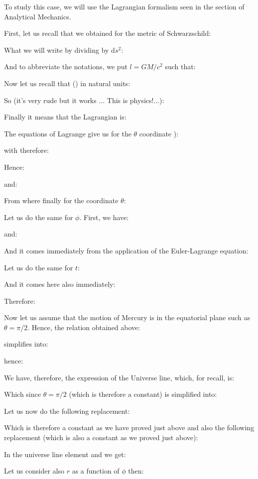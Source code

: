 	To study this case, we will use the Lagrangian formalism seen in the section of Analytical Mechanics.

	First, let us recall that we obtained for the metric of Schwarzschild:
	
	What we will write by dividing by $\mathrm{d}s^2$:
	
	And to abbreviate the notations, we put $l=GM/c^2$ such that:
	
	Now let us recall that () in natural units:
	
	So (it's very rude but it works ... This is physics!...):
	
	Finally it means that the Lagrangian is:
	
	The equations of Lagrange give us for the $\theta$ coordinate ):
	
	with therefore:
	
	Hence:
	
	and:
	
	From where finally for the coordinate $\theta$:
	
	Let us do the same for $\phi$. First, we have:
	
	and:
	
	And it comes immediately from the application of the Euler-Lagrange equation:
	
	Let us do the same for $t$:
	
	And it comes here also immediately:
	
	Therefore:
	
	Now let us assume that the motion of Mercury is in the equatorial plane such as $\theta=\pi/2$. Hence, the relation obtained above:
	
	simplifies into:
	
	hence:
	
	We have, therefore, the expression of the Universe line, which, for recall, is:
	
	Which since $\theta=\pi/2$ (which is therefore a constant) is simplified into:
	
	Let us now do the following replacement:
	
	Which is therefore a constant as we have proved just above and also the following replacement (which is also a constant as we proved just above):
	
	In the universe line element and we get:
	
	Let us consider also $r$ as a function of $\phi$ then:
	
